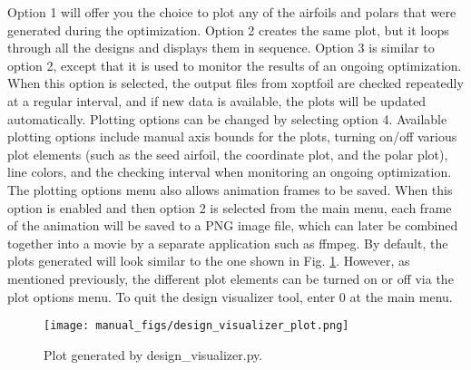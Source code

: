 \documentclass[11pt]{article}
\begin{document}
Option 1 will offer you the choice to plot any of the airfoils and polars that were
generated during the optimization.  Option 2 creates the same plot, but it loops through
all the designs and displays them in sequence.  Option 3 is similar to option 2, except
that it is used to monitor the results of an ongoing optimization.  When this option is
selected, the output files from xoptfoil are checked repeatedly at a regular interval, and
if new data is available, the plots will be updated automatically. Plotting options can be 
changed by selecting option 4.  Available plotting options include manual axis bounds for 
the plots, turning on/off various plot elements (such as the seed airfoil, the coordinate 
plot, and the polar plot), line colors, and the checking interval when monitoring an
ongoing optimization.  The plotting options menu also allows animation frames to be saved.
When this option is enabled and then option 2 is selected from the main menu, each frame
of the animation will be saved to a PNG image file, which can later be combined together
into a movie by a separate application such as ffmpeg.  By default, the plots generated 
will look similar to the one shown in Fig. \ref{fig:design_visualizer_plot}.  However, as
mentioned previously, the different plot elements can be turned on or off via the plot 
options menu. To quit the design visualizer tool, enter 0 at the main menu.

\begin{figure}
\centering
  \texttt{[image: manual\_figs/design\_visualizer\_plot.png]}
\caption{Plot generated by design\_visualizer.py.}
\label{fig:design_visualizer_plot}
\end{figure}
\end{document}
